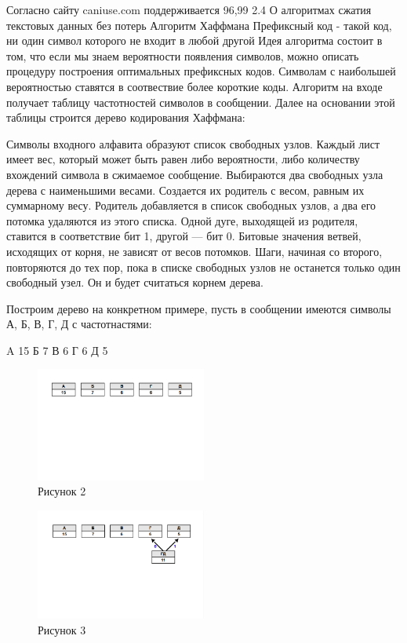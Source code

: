 \documentclass[12pt]{article}
\begin{document}
    Согласно сайту caniuse.com поддерживается 96,99%
    2.4 О алгоритмах сжатия текстовых данных без потерь
    Алгоритм Хаффмана
    Префиксный код - такой код, ни один символ которого не входит в любой другой
    Идея алгоритма состоит в том, что если мы знаем вероятности появления символов, можно описать процедуру построения оптимальных префиксных кодов. Символам с наибольшей вероятностью ставятся в соотвествие более короткие коды.
    Алгоритм на входе получает таблицу частотностей символов в сообщении. Далее на основании этой таблицы строится дерево кодирования Хаффмана:

    Символы входного алфавита образуют список свободных узлов. Каждый лист имеет вес, который может быть равен либо вероятности, либо количеству вхождений символа в сжимаемое сообщение.
    Выбираются два свободных узла дерева с наименьшими весами.
    Создается их родитель с весом, равным их суммарному весу.
    Родитель добавляется в список свободных узлов, а два его потомка удаляются из этого списка.
    Одной дуге, выходящей из родителя, ставится в соответствие бит 1, другой — бит 0. Битовые значения ветвей, исходящих от корня, не зависят от весов потомков.
    Шаги, начиная со второго, повторяются до тех пор, пока в списке свободных узлов не останется только один свободный узел. Он и будет считаться корнем дерева.

    Построим дерево на конкретном примере, пусть в сообщении имеются символы А, Б, В, Г, Д с частотнастями:

    A 15
    Б 7
    В 6
    Г 6
    Д 5

    \begin{figure}[h!]
        \centering
        \includegraphics[width=0.5\textwidth]{../images/haffman/phase0.png}
        \caption{Рисунок 2}
    \end{figure}

    \begin{figure}[h!]
        \centering
        \includegraphics[width=0.5\textwidth]{../images/haffman/phase1.png}
        \caption{Рисунок 3}
    \end{figure}
\end{document}

